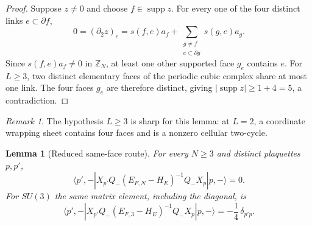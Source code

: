 \documentclass[11pt]{article}
\theoremstyle{plain}
\newtheorem{lemma}[theorem]{Lemma}
\theoremstyle{definition}
\theoremstyle{remark}
\newtheorem{remark}[theorem]{Remark}
\begin{document}
\begin{proof}
Suppose $z\ne0$ and choose $f\in\operatorname{supp}z$.  For every one of
the four distinct links $e\subset\partial f$,
\[
 0=(\partial_2z)_e
 =s(f,e)a_f+
 \sum_{\substack{g\ne f\\e\subset\partial g}}s(g,e)a_g .
\]
Since $s(f,e)a_f\ne0$ in $\mathbb Z_N$, at least one other supported face
$g_e$ contains $e$.  For $L\ge3$, two distinct elementary faces of the
periodic cubic complex share at most one link.  The four faces $g_e$ are
therefore distinct, giving $|\operatorname{supp}z|\ge1+4=5$, a
contradiction.
\end{proof}

\begin{remark}
The hypothesis $L\ge3$ is sharp for this lemma: at $L=2$, a coordinate
wrapping sheet contains four faces and is a nonzero cellular two-cycle.
\end{remark}

\begin{lemma}[Reduced same-face route]
\label{lem:reduced-same-face}
For every $N\ge3$ and distinct plaquettes $p,p'$,
\begin{equation}\label{eq:same-face-offdiag}
 \langle p',-|X_{p'}Q_-(E_{F,N}-H_E)^{-1}
 Q_-X_p|p,-\rangle=0 .
\end{equation}
For $SU(3)$ the same matrix element, including the diagonal, is
\begin{equation}\label{eq:su3-same-face-resolvent}
 \langle p',-|X_{p'}Q_-(E_{F,3}-H_E)^{-1}
 Q_-X_p|p,-\rangle=-\frac14\,\delta_{p'p} .
\end{equation}
\end{lemma}
\end{document}
